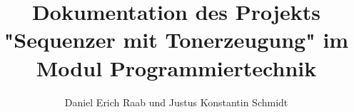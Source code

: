 \documentclass[12pt, a4paper, german]{article}
\title{Dokumentation des Projekts "Sequenzer mit Tonerzeugung" im Modul Programmiertechnik}
\author{Daniel Erich Raab und Justus Konstantin Schmidt}
\begin{document}
\def\startlcdtable{
	\begin{figure}[h]
	\ttfamily
	\centering
	\setlength{\tabcolsep}{2pt} %
	\begin{tabular}{|cccccccccccccccc|}
	\hline
}
\def\endlcdtable#1#2{
	\hline
	\end{tabular}
	\normalfont
	\caption{#1}
	\label{#2}
	\end{figure}
}

\newcommand{\lcdtext}[1] {\texttt{\framebox[1.1\width]{#1}}}

\newcommand{\source}[1] {\texttt{#1}}

\newcommand{\xydiagram}[3]{
	\begin{figure}[h]
	\centering
	\[
	\begin{xy}
	\xymatrix {
		#1
	}
	\end{xy}
	\]
	\caption{#2}
	\label{#3}
	\end{figure}
}


\maketitle
\tableofcontents








\end{document}
